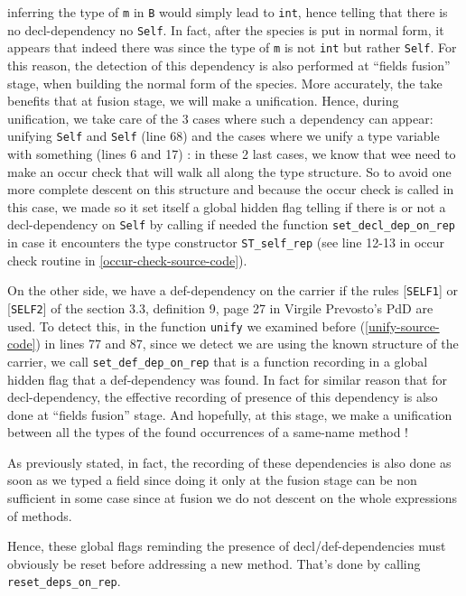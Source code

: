\noindent inferring the type of {\tt m} in {\tt B} would simply lead to
{\tt int}, hence telling that there is no decl-dependency no
{\tt Self}. In fact, after the species is put in normal form, it
appears that indeed there was since the type of {\tt m} is not
{\tt int} but rather {\tt Self}. For this reason, the detection of
this dependency is also performed at ``fields fusion'' stage, when
building the normal form of the species. More accurately, the take
benefits that at fusion stage, we will make a unification. Hence,
during unification, we take care of the 3 cases where such a
dependency can appear: unifying {\tt Self} and {\tt Self} (line 68)
and the cases where we unify a type variable with something (lines 6
and 17) : in these 2 last cases, we know that wee need to make an
occur check that will walk all along the type structure. So to avoid
one more complete descent on this structure and because the occur
check is called in this case, we made so it set itself a global hidden
flag telling if there is or not a decl-dependency on {\tt Self} by
calling if needed the function {\tt set\_decl\_dep\_on\_rep} in case
it encounters the type constructor {\tt ST\_self\_rep} (see line 12-13
in occur check routine in \ref{occur-check-source-code}).

\medskip
On the other side, we have a def-dependency on the carrier if the
rules [{\tt SELF1}] or [{\tt SELF2}] of the section 3.3, definition 9,
page 27 in Virgile Prevosto's PdD are used. To detect this, in
the function {\tt unify} we examined before (\ref{unify-source-code})
in lines 77 and 87, since we detect we are using the known structure
of the carrier, we call {\tt set\_def\_dep\_on\_rep} that is a
function recording in a global hidden flag that a def-dependency was
found. In fact for similar reason that for decl-dependency, the
effective recording of presence of this dependency is also done at 
``fields fusion'' stage. And hopefully, at this stage, we make a
unification between all the types of the found occurrences of a
same-name method !

\medskip
As previously stated, in fact, the recording of these dependencies is
also done as soon as we typed a field since doing it only at the
fusion stage can be non sufficient in some case since at fusion we do
not descent on the whole expressions of methods.

\medskip
Hence, these global flags reminding the presence of
decl/def-dependencies must obviously be reset before addressing a
new method. That's done by calling {\tt reset\_deps\_on\_rep}.



